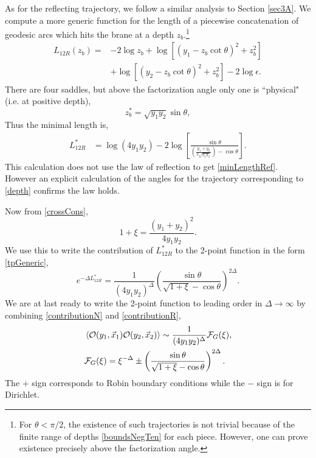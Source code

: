 \documentclass[reprint,amsmath,amssymb,aps,nofootinbib,twocolumn]{revtex4-2}
\begin{document}
As for the reflecting trajectory, we follow a similar analysis to Section \ref{sec3A}. We compute a more generic function for the length of a piecewise concatenation of geodesic arcs which hits the brane at a depth $z_b$.\footnote{For $\theta < \pi/2$, the existence of such trajectories is not trivial because of the finite range of depths \eqref{boundsNegTen} for each piece. However, one can prove existence precisely above the factorization angle.}
\begin{equation}
\begin{split}
L_{12R}(z_b)
= &-2\log z_b + \log\left[\left(y_1 - z_b \cot\theta\right)^2 + z_b^2\right]\\
&+ \log\left[\left(y_2 - z_b \cot\theta\right)^2 + z_b^2\right] - 2\log\epsilon.
\end{split}
\end{equation}
There are four saddles, but above the factorization angle only one is ``physical" (i.e. at positive depth),
\begin{equation}
z_b^* = \sqrt{y_1 y_2}\sin\theta,\label{depth}
\end{equation}
Thus the minimal length is,
\begin{align}
L_{12R}^*
&= \log(4y_1 y_2) - 2\log\left[\frac{\sin\theta}{\left(\frac{y_1 + y_2}{2\sqrt{y_1 y_2}}\right) - \cos\theta}\right].\label{minLengthRef}
\end{align}
This calculation does not use the law of reflection to get \eqref{minLengthRef}. However an explicit calculation of the angles for the trajectory corresponding to \eqref{depth} confirms the law holds.

Now from \eqref{crossCons},
\begin{equation}
1 + \xi = \frac{(y_1 + y_2)^2}{4y_1 y_2}.
\end{equation}
We use this to write the contribution of $L_{12R}^*$ to the 2-point function in the form \eqref{tpGeneric},
\begin{equation}
e^{-\Delta L_{12R}^*} = \frac{1}{(4y_1 y_2)^\Delta} \left(\frac{\sin\theta}{\sqrt{1 + \xi} - \cos\theta}\right)^{2\Delta}.\label{contributionR}
\end{equation}
We are at last ready to write the 2-point function to leading order in $\Delta \to \infty$ by combining \eqref{contributionN} and \eqref{contributionR},
\begin{align}
&\expval{\mathcal{O}(y_1,\vec{x}_1)\mathcal{O}(y_2,\vec{x}_2)} \sim \frac{1}{(4y_1 y_2)^\Delta}\mathcal{F}_G(\xi),\label{tpGeo}\\
&\mathcal{F}_G(\xi) = \xi^{-\Delta} \pm \left(\frac{\sin\theta}{\sqrt{1+\xi} - \cos\theta}\right)^{2\Delta}.\label{tpGeoStructure}
\end{align}
The $+$ sign corresponds to Robin boundary conditions while the $-$ sign is for Dirichlet.
\end{document}

